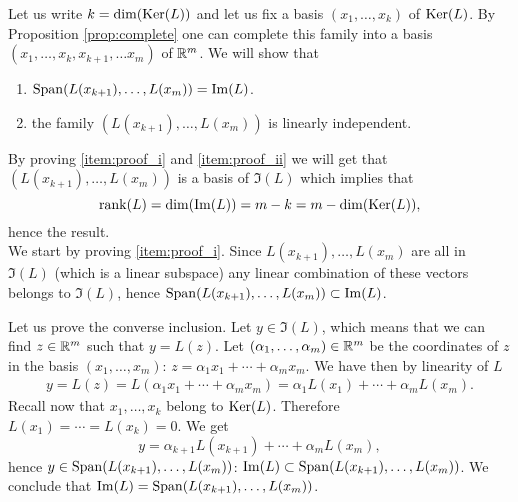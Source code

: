 \documentclass[11pt,nocut]{article}
\begin{document}
	Let us write $k = {{\rm dim}}({{\rm Ker}}(L))$ and let us fix a basis $(x_1, \dots, x_k)$ of ${{\rm Ker}}(L)$. By Proposition \ref{prop:complete} one can complete this family into a basis $(x_1, \dots, x_k, x_{k+1}, \dots x_m)$ of $\mathbb{R}^m$.
	We will show that
	\begin{enumerate}[label=(\roman*)]
		\item \label{item:proof_i} ${{\rm Span}}(L(x_{k+1}), \dots, L(x_m)) = {{\rm Im}}(L)$.
		\item \label{item:proof_ii} the family $(L(x_{k+1}), \dots, L(x_{m}))$ is linearly independent.
	\end{enumerate}

	By proving \ref{item:proof_i} and \ref{item:proof_ii} we will get that $(L(x_{k+1}), \dots, L(x_{m}))$ is a basis of $\Im(L)$ which implies that 
	$$
	{{\rm rank}}(L) = {{\rm dim}}({{\rm Im}}(L)) = m - k = m - {{\rm dim}}({{\rm Ker}}(L)),
	$$
	hence the result.
\\

We start by proving \ref{item:proof_i}. Since $L(x_{k+1}), \dots, L(x_m)$ are all in $\Im(L)$ (which is a linear subspace) any linear combination of these vectors belongs to $\Im(L)$, hence ${{\rm Span}}(L(x_{k+1}), \dots, L(x_m)) \subset {{\rm Im}}(L)$.

Let us prove the converse inclusion.
Let $y \in \Im(L)$, which means that we can find $z \in \mathbb{R}^m$ such that $y = L(z)$. Let $(\alpha_1, \dots, \alpha_m) \in \mathbb{R}^m$ be the coordinates of $z$ in the basis $(x_1, \dots, x_m)$: $z = \alpha_1 x_1 + \cdots + \alpha_m x_m$. We have then by linearity of $L$
\begin{align*}
y = L(z) = L(\alpha_1 x_1 + \cdots + \alpha_m x_m)
= \alpha_1 L(x_1) + \cdots + \alpha_m L(x_m).
\end{align*}
Recall now that $x_1, \dots, x_k$ belong to ${{\rm Ker}}(L)$. Therefore $L(x_1) = \cdots = L(x_k) = 0$. We get
$$
y = \alpha_{k+1} L(x_{k+1}) + \cdots + \alpha_{m} L(x_{m}),
$$
hence $y \in {{\rm Span}}(L(x_{k+1}), \dots, L(x_m))$: ${{\rm Im}}(L) \subset {{\rm Span}}(L(x_{k+1}), \dots, L(x_m))$. We conclude that ${{\rm Im}}(L) = {{\rm Span}}(L(x_{k+1}), \dots, L(x_m))$.
\\
\end{document}
